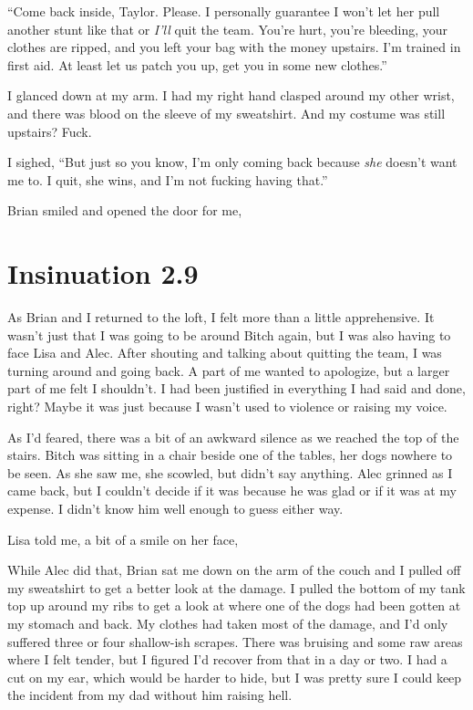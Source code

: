 “Come back inside, Taylor. Please. I personally guarantee I won't let her pull another stunt like that or {\em I'll} quit the team. You're hurt, you're bleeding, your clothes are ripped, and you left your bag with the money upstairs. I'm trained in first aid. At least let us patch you up, get you in some new clothes.”

I glanced down at my arm. I had my right hand clasped around my other wrist, and there was blood on the sleeve of my sweatshirt. And my costume was still upstairs? Fuck.

 I sighed, “But just so you know, I'm only coming back because {\em she} doesn't want me to. I quit, she wins, and I'm not fucking having that.”

Brian smiled and opened the door for me, 


\chapter{Insinuation 2.9}

As Brian and I returned to the loft, I felt more than a little apprehensive. It wasn't just that I was going to be around Bitch again, but I was also having to face Lisa and Alec. After shouting and talking about quitting the team, I was turning around and going back. A part of me wanted to apologize, but a larger part of me felt I shouldn't. I had been justified in everything I had said and done, right? Maybe it was just because I wasn't used to violence or raising my voice.

As I'd feared, there was a bit of an awkward silence as we reached the top of the stairs. Bitch was sitting in a chair beside one of the tables, her dogs nowhere to be seen. As she saw me, she scowled, but didn't say anything. Alec grinned as I came back, but I couldn't decide if it was because he was glad or if it was at my expense. I didn't know him well enough to guess either way.

 Lisa told me, a bit of a smile on her face, 

While Alec did that, Brian sat me down on the arm of the couch and I pulled off my sweatshirt to get a better look at the damage. I pulled the bottom of my tank top up around my ribs to get a look at where one of the dogs had been gotten at my stomach and back. My clothes had taken most of the damage, and I'd only suffered three or four shallow-ish scrapes. There was bruising and some raw areas where I felt tender, but I figured I'd recover from that in a day or two. I had a cut on my ear, which would be harder to hide, but I was pretty sure I could keep the incident from my dad without him raising hell.

